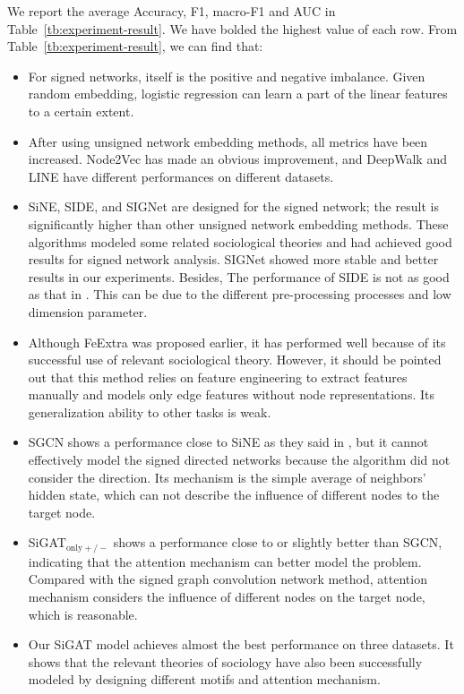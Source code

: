 \documentclass[runningheads]{llncs}
\begin{document}
We report the average Accuracy, F1, macro-F1 and AUC in Table~\ref{tb:experiment-result}. 
We have bolded the highest value of each row. From Table~\ref{tb:experiment-result}, we can find that:
\begin{itemize}
    \item For signed networks, itself is the positive and negative imbalance.
    Given random embedding, logistic regression can learn a part of the linear features to a certain extent.
    \item After using unsigned network embedding methods, all metrics have been increased. Node2Vec has made an obvious improvement, and DeepWalk and LINE have different performances on different datasets.  
    \item SiNE, SIDE, and SIGNet are designed for the signed network; the result is significantly higher than other unsigned network embedding methods. These algorithms modeled some related sociological theories and had achieved good results for signed network analysis. SIGNet showed more stable and better results in our experiments. Besides, The performance of SIDE is not as good as that in \cite{kim2018side}. This can be due to the different pre-processing processes and low dimension parameter. 
    \item  Although FeExtra was proposed earlier, it has performed well because of its successful use of relevant sociological theory. However, it should be pointed out that this method relies on feature engineering to extract features manually and models only edge features without node representations. Its generalization ability to other tasks is weak.
    \item SGCN shows a performance close to SiNE as they said in \cite{derr2018signed}, but it cannot effectively model the signed directed networks because the algorithm did not consider the direction. Its mechanism is the simple average of neighbors' hidden state, which can not describe the influence of different nodes to the target node. 
    \item SiGAT$_{\mathrm{only +/-}}$ shows a performance close to or slightly better than SGCN, indicating that the attention mechanism can better model the problem. Compared with the signed graph convolution network method, attention mechanism considers the influence of different nodes on the target node, which is reasonable.
    \item Our SiGAT model achieves almost the best performance on three datasets. It shows that the relevant theories of sociology have also been successfully modeled by designing different motifs and attention mechanism.
\end{itemize}
\end{document}
